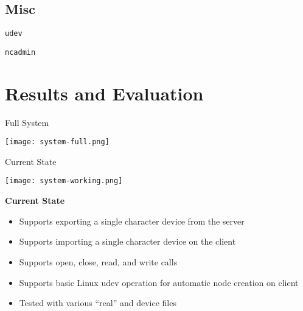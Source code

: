 \documentclass[handout]{beamer}
\begin{document}
\subsection{Misc}

\begin{frame}{\texttt{udev}}
\end{frame}

\begin{frame}{\texttt{ncadmin}}
\end{frame}



\section{Results and Evaluation}

\begin{frame}[c]{Full System}
  \begin{center}
    \texttt{[image: system-full.png]}
  \end{center}
\end{frame}

\begin{frame}[c]{Current State}
  \begin{center}
    \texttt{[image: system-working.png]}
  \end{center}
\end{frame}

\begin{frame}{\bf Current State}

  \begin{itemize}
  \item<1-> Supports exporting a single character device from the server
  \item<2-> Supports importing a single character device on the client
  \item<3-> Supports open, close, read, and write calls
  \item<4-> Supports basic Linux udev operation for automatic node
    creation on client
  \item<5-> Tested with various ``real'' and device files
  \end{itemize}
  
\end{frame}
\end{document}
